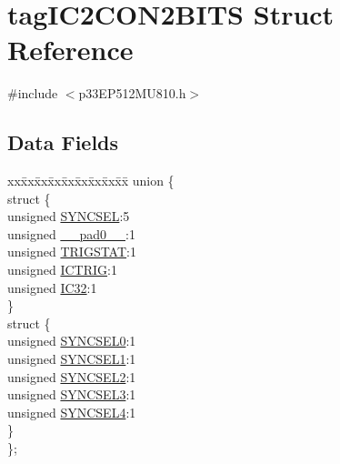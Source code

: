 \hypertarget{structtag_i_c2_c_o_n2_b_i_t_s}{}\section{tag\+I\+C2\+C\+O\+N2\+B\+I\+TS Struct Reference}
\label{structtag_i_c2_c_o_n2_b_i_t_s}


{\ttfamily \#include $<$p33\+E\+P512\+M\+U810.\+h$>$}

\subsection*{Data Fields}
\begin{DoxyCompactItemize}
\item 
\begin{tabbing}
xx\=xx\=xx\=xx\=xx\=xx\=xx\=xx\=xx\=\kill
union \{\\
\>struct \{\\
\>\>unsigned \hyperlink{structtag_i_c2_c_o_n2_b_i_t_s_a35fbbe11485c2615ed27535b62c3fa35}{SYNCSEL}:5\\
\>\>unsigned \hyperlink{structtag_i_c2_c_o_n2_b_i_t_s_adf71f3d8410c1f1dbbc96680a92c49af}{\_\_pad0\_\_}:1\\
\>\>unsigned \hyperlink{structtag_i_c2_c_o_n2_b_i_t_s_ab379549de54ac93ad4aa73686c34cb7c}{TRIGSTAT}:1\\
\>\>unsigned \hyperlink{structtag_i_c2_c_o_n2_b_i_t_s_a79bd14cfd2e403f3a96ce0b3bb58097b}{ICTRIG}:1\\
\>\>unsigned \hyperlink{structtag_i_c2_c_o_n2_b_i_t_s_afc705120246cb4ca0c93c87817519b7f}{IC32}:1\\
\>\} \\
\>struct \{\\
\>\>unsigned \hyperlink{structtag_i_c2_c_o_n2_b_i_t_s_a3b5df3154fde5141e6ac0156425ff8b4}{SYNCSEL0}:1\\
\>\>unsigned \hyperlink{structtag_i_c2_c_o_n2_b_i_t_s_a50e73f95ab1c258ddc64f69c0991deaf}{SYNCSEL1}:1\\
\>\>unsigned \hyperlink{structtag_i_c2_c_o_n2_b_i_t_s_a304907a5d2c4cbf1114a54642a85951e}{SYNCSEL2}:1\\
\>\>unsigned \hyperlink{structtag_i_c2_c_o_n2_b_i_t_s_a6bbd1bd2ead6c9fa713969c6eb0f0c75}{SYNCSEL3}:1\\
\>\>unsigned \hyperlink{structtag_i_c2_c_o_n2_b_i_t_s_a0cd5bbe196c7974953909d27a6307bb7}{SYNCSEL4}:1\\
\>\} \\
\}; \\

\end{tabbing}\end{DoxyCompactItemize}


